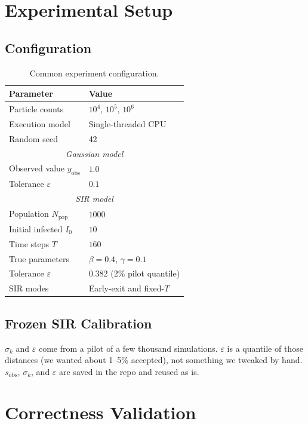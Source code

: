 \documentclass[conference]{IEEEtran}
\begin{document}
\section{Experimental Setup}

\subsection{Configuration}

\begin{table}[H]
\caption{Common experiment configuration.}
\label{tab:config}
\centering
\begin{tabular}{ll}
\toprule
Parameter & Value \\
\midrule
Particle counts & $10^4$, $10^5$, $10^6$ \\
Execution model & Single-threaded CPU \\
Random seed & 42 \\
\midrule
\multicolumn{2}{c}{\emph{Gaussian model}} \\
\midrule
Observed value $y_{\mathrm{obs}}$ & $1.0$ \\
Tolerance $\varepsilon$ & $0.1$ \\
\midrule
\multicolumn{2}{c}{\emph{SIR model}} \\
\midrule
Population $N_{\mathrm{pop}}$ & $1000$ \\
Initial infected $I_0$ & $10$ \\
Time steps $T$ & $160$ \\
True parameters & $\beta = 0.4$, $\gamma = 0.1$ \\
Tolerance $\varepsilon$ & $0.382$ (2\% pilot quantile) \\
SIR modes & Early-exit and fixed-$T$ \\
\bottomrule
\end{tabular}
\end{table}

\subsection{Frozen SIR Calibration}

$\sigma_k$ and $\varepsilon$ come from a pilot of a few thousand simulations.
$\varepsilon$ is a quantile of those distances (we wanted about 1--5\%
accepted), not something we tweaked by hand. $s_{\mathrm{obs}}$, $\sigma_k$,
and $\varepsilon$ are saved in the repo and reused as is.

\section{Correctness Validation}
\end{document}
